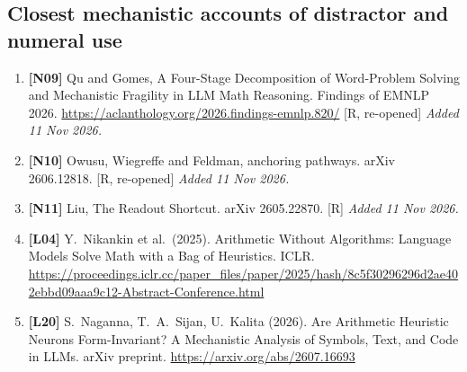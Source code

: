 \documentclass[10pt,a4paper]{article}
\begin{document}
{\subsection*{Closest mechanistic accounts of distractor and numeral use}
\begin{enumerate}[label={},leftmargin=0pt]
\item \textbf{[N09]} Qu and Gomes, A Four-Stage Decomposition of Word-Problem Solving and Mechanistic Fragility in LLM Math Reasoning. Findings of EMNLP 2026. \url{https://aclanthology.org/2026.findings-emnlp.820/}
[R, re-opened] \emph{Added 11 Nov 2026.}
\item \textbf{[N10]} Owusu, Wiegreffe and Feldman, anchoring pathways. arXiv 2606.12818. [R, re-opened]
\emph{Added 11 Nov 2026.}
\item \textbf{[N11]} Liu, The Readout Shortcut. arXiv 2605.22870. [R] \emph{Added 11 Nov 2026.}
\item \textbf{[L04]} Y.~Nikankin et al.\ (2025). Arithmetic Without Algorithms: Language Models Solve Math with a
Bag of Heuristics. ICLR.
\url{https://proceedings.iclr.cc/paper_files/paper/2025/hash/8c5f30296296d2ae402ebbd09aaa9c12-Abstract-Conference.html}
\item \textbf{[L20]} S.~Naganna, T.~A.~Sijan, U.~Kalita (2026). Are Arithmetic Heuristic Neurons Form-Invariant? A
Mechanistic Analysis of Symbols, Text, and Code in LLMs. arXiv preprint. \url{https://arxiv.org/abs/2607.16693}
\end{enumerate}

}
\end{document}
